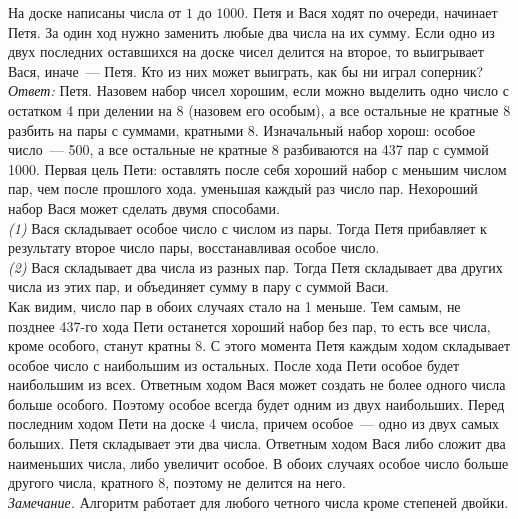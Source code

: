 \problem{}
На доске написаны числа от $1$ до $1000$.
Петя и Вася ходят по очереди, начинает Петя.
За один ход нужно заменить любые два числа на их сумму.
Если одно из двух последних оставшихся на доске чисел делится на второе, то
выигрывает Вася, иначе~--- Петя.
Кто из них может выиграть, как бы ни играл соперник?
\solution
\emph{Ответ:} Петя.
Назовем набор чисел хорошим, если можно выделить одно число с остатком 4 при
делении на 8 (назовем его особым), а все остальные не кратные 8 разбить на пары
с суммами, кратными 8.
Изначальный набор хорош: особое число~--- 500, а все остальные не кратные 8
разбиваются на 437 пар с суммой 1000.
Первая цель Пети: оставлять после себя хороший набор с меньшим числом пар, чем
после прошлого хода. уменьшая каждый раз число пар.
Нехороший набор Вася может сделать двумя способами.
\\\emph{(1)}
Вася складывает особое число с числом из пары.
Тогда Петя прибавляет к результату второе число пары, восстанавливая особое
число.
\\\emph{(2)}
Вася складывает два числа из разных пар.
Тогда Петя складывает два других числа из этих пар, и объединяет сумму в пару с
суммой Васи.
\\
Как видим, число пар в обоих случаях стало на 1 меньше.
Тем самым, не позднее 437-го хода Пети останется хороший набор без пар, то есть
все числа, кроме особого, станут кратны 8.
С этого момента Петя каждым ходом складывает особое число с наибольшим из
остальных.
После хода Пети особое будет наибольшим из всех.
Ответным ходом Вася может создать не более одного числа больше особого.
Поэтому особое всегда будет одним из двух наибольших.
Перед последним ходом Пети на доске 4 числа, причем особое~--- одно из двух
самых больших.
Петя складывает эти два числа.
Ответным ходом Вася либо сложит два наименьших числа, либо увеличит особое.
В обоих случаях особое число больше другого числа, кратного 8, поэтому не
делится на него.
\\
\emph{Замечание.}
Алгоритм работает для любого четного числа кроме степеней двойки.
\endproblem
